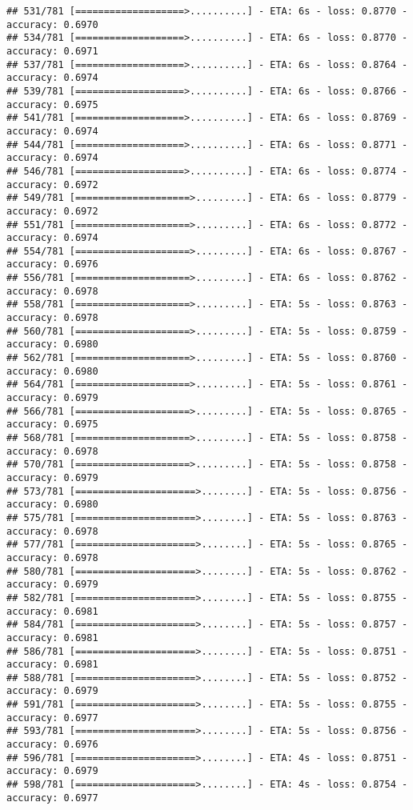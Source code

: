 \documentclass[
]{article}
\begin{document}
\begin{verbatim}
## 531/781 [===================>..........] - ETA: 6s - loss: 0.8770 - accuracy: 0.6970
## 534/781 [===================>..........] - ETA: 6s - loss: 0.8770 - accuracy: 0.6971
## 537/781 [===================>..........] - ETA: 6s - loss: 0.8764 - accuracy: 0.6974
## 539/781 [===================>..........] - ETA: 6s - loss: 0.8766 - accuracy: 0.6975
## 541/781 [===================>..........] - ETA: 6s - loss: 0.8769 - accuracy: 0.6974
## 544/781 [===================>..........] - ETA: 6s - loss: 0.8771 - accuracy: 0.6974
## 546/781 [===================>..........] - ETA: 6s - loss: 0.8774 - accuracy: 0.6972
## 549/781 [====================>.........] - ETA: 6s - loss: 0.8779 - accuracy: 0.6972
## 551/781 [====================>.........] - ETA: 6s - loss: 0.8772 - accuracy: 0.6974
## 554/781 [====================>.........] - ETA: 6s - loss: 0.8767 - accuracy: 0.6976
## 556/781 [====================>.........] - ETA: 6s - loss: 0.8762 - accuracy: 0.6978
## 558/781 [====================>.........] - ETA: 5s - loss: 0.8763 - accuracy: 0.6978
## 560/781 [====================>.........] - ETA: 5s - loss: 0.8759 - accuracy: 0.6980
## 562/781 [====================>.........] - ETA: 5s - loss: 0.8760 - accuracy: 0.6980
## 564/781 [====================>.........] - ETA: 5s - loss: 0.8761 - accuracy: 0.6979
## 566/781 [====================>.........] - ETA: 5s - loss: 0.8765 - accuracy: 0.6975
## 568/781 [====================>.........] - ETA: 5s - loss: 0.8758 - accuracy: 0.6978
## 570/781 [====================>.........] - ETA: 5s - loss: 0.8758 - accuracy: 0.6979
## 573/781 [=====================>........] - ETA: 5s - loss: 0.8756 - accuracy: 0.6980
## 575/781 [=====================>........] - ETA: 5s - loss: 0.8763 - accuracy: 0.6978
## 577/781 [=====================>........] - ETA: 5s - loss: 0.8765 - accuracy: 0.6978
## 580/781 [=====================>........] - ETA: 5s - loss: 0.8762 - accuracy: 0.6979
## 582/781 [=====================>........] - ETA: 5s - loss: 0.8755 - accuracy: 0.6981
## 584/781 [=====================>........] - ETA: 5s - loss: 0.8757 - accuracy: 0.6981
## 586/781 [=====================>........] - ETA: 5s - loss: 0.8751 - accuracy: 0.6981
## 588/781 [=====================>........] - ETA: 5s - loss: 0.8752 - accuracy: 0.6979
## 591/781 [=====================>........] - ETA: 5s - loss: 0.8755 - accuracy: 0.6977
## 593/781 [=====================>........] - ETA: 5s - loss: 0.8756 - accuracy: 0.6976
## 596/781 [=====================>........] - ETA: 4s - loss: 0.8751 - accuracy: 0.6979
## 598/781 [=====================>........] - ETA: 4s - loss: 0.8754 - accuracy: 0.6977

\end{verbatim}
\end{document}
